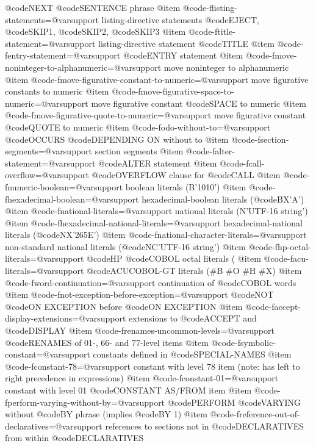@code{NEXT} @code{SENTENCE} phrase
@item @code{-flisting-statements=@var{support}}
listing-directive statements @code{EJECT}, @code{SKIP}1, @code{SKIP}2, @code{SKIP}3
@item @code{-ftitle-statement=@var{support}}
listing-directive statement @code{TITLE}
@item @code{-fentry-statement=@var{support}}
@code{ENTRY} statement
@item @code{-fmove-noninteger-to-alphanumeric=@var{support}}
move noninteger to alphanumeric
@item @code{-fmove-figurative-constant-to-numeric=@var{support}}
move figurative constants to numeric
@item @code{-fmove-figurative-space-to-numeric=@var{support}}
move figurative constant @code{SPACE} to numeric
@item @code{-fmove-figurative-quote-to-numeric=@var{support}}
move figurative constant @code{QUOTE} to numeric
@item @code{-fodo-without-to=@var{support}}
@code{OCCURS} @code{DEPENDING ON} without to
@item @code{-fsection-segments=@var{support}}
section segments
@item @code{-falter-statement=@var{support}}
@code{ALTER} statement
@item @code{-fcall-overflow=@var{support}}
@code{OVERFLOW} clause for @code{CALL}
@item @code{-fnumeric-boolean=@var{support}}
boolean literals (B'1010')
@item @code{-fhexadecimal-boolean=@var{support}}
hexadecimal-boolean literals (@code{BX}'A')
@item @code{-fnational-literals=@var{support}}
national literals (N'UTF-16 string')
@item @code{-fhexadecimal-national-literals=@var{support}}
hexadecimal-national literals (@code{NX}'265E')
@item @code{-fnational-character-literals=@var{support}}
non-standard national literals (@code{NC}'UTF-16 string')
@item @code{-fhp-octal-literals=@var{support}}
@code{HP} @code{COBOL} octal literals (%
@item @code{-facu-literals=@var{support}}
@code{ACUCOBOL-GT} literals (#B #O #H #X)
@item @code{-fword-continuation=@var{support}}
continuation of @code{COBOL} words
@item @code{-fnot-exception-before-exception=@var{support}}
@code{NOT} @code{ON EXCEPTION} before @code{ON EXCEPTION}
@item @code{-faccept-display-extensions=@var{support}}
extensions to @code{ACCEPT} and @code{DISPLAY}
@item @code{-frenames-uncommon-levels=@var{support}}
@code{RENAMES} of 01-, 66- and 77-level items
@item @code{-fsymbolic-constant=@var{support}}
constants defined in @code{SPECIAL-NAMES}
@item @code{-fconstant-78=@var{support}}
constant with level 78 item (note: has left to right precedence in expressions)
@item @code{-fconstant-01=@var{support}}
constant with level 01 @code{CONSTANT AS}/FROM item
@item @code{-fperform-varying-without-by=@var{support}}
@code{PERFORM} @code{VARYING} without @code{BY} phrase (implies @code{BY} 1)
@item @code{-freference-out-of-declaratives=@var{support}}
references to sections not in @code{DECLARATIVES} from within @code{DECLARATIVES}
